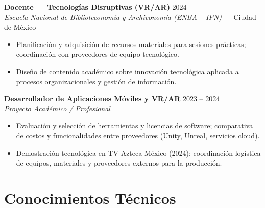 \documentclass[10pt, letterpaper]{article}
\begin{document}
\vspace{4pt}
\noindent
\textbf{Docente — Tecnologías Disruptivas (VR/AR)} \hfill
\textcolor{gris}{2024}\\
\textit{Escuela Nacional de Biblioteconomía y Archivonomía (ENBA – IPN)} — Ciudad de México
\begin{itemize}
  \item Planificación y adquisición de recursos materiales para sesiones prácticas;
        coordinación con proveedores de equipo tecnológico.
  \item Diseño de contenido académico sobre innovación tecnológica aplicada a procesos
        organizacionales y gestión de información.
\end{itemize}

\vspace{4pt}
\noindent
\textbf{Desarrollador de Aplicaciones Móviles y VR/AR} \hfill
\textcolor{gris}{2023 – 2024}\\
\textit{Proyecto Académico / Profesional}
\begin{itemize}
  \item Evaluación y selección de herramientas y licencias de software; comparativa de
        costos y funcionalidades entre proveedores (Unity, Unreal, servicios cloud).
  \item Demostración tecnológica en TV Azteca México (2024): coordinación logística de
        equipos, materiales y proveedores externos para la producción.
\end{itemize}

\section{Conocimientos Técnicos}
\end{document}
